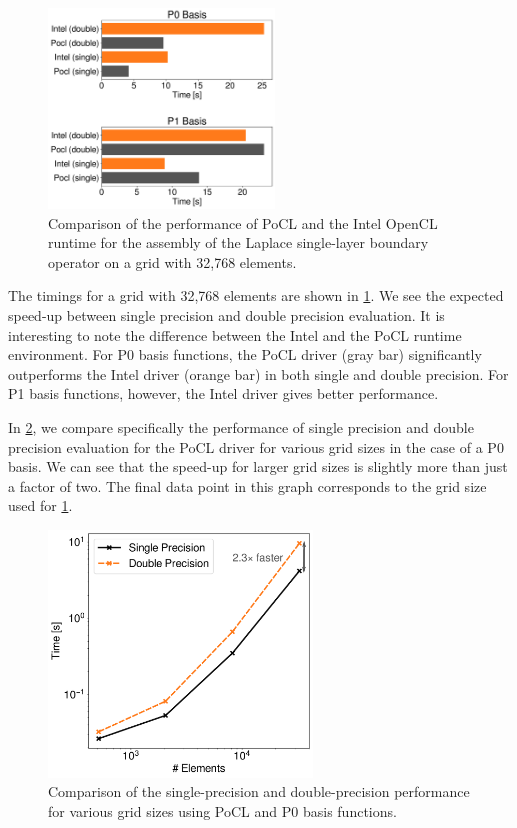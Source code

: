 \documentclass{IEEEcsmag}
\begin{document}
\begin{figure}
	\center
	\includegraphics[width=6cm]{intel_pocl_laplace_comp.pdf}
	\caption{Comparison of the performance of PoCL and the Intel OpenCL runtime for the assembly of the Laplace single-layer boundary operator on a grid with 32,768 elements.}
	\label{fig:intel_pocl_laplace_cmp}
\end{figure}

The timings for a grid with 32,768 elements are shown in \cref{fig:intel_pocl_laplace_cmp}. We see the expected speed-up between single precision and double precision evaluation. It is interesting to note the difference between the Intel and the PoCL runtime environment. For P0 basis functions, the PoCL driver (gray bar) significantly outperforms the Intel driver (orange bar) in both single and double precision. For P1 basis functions, however, the Intel driver gives better performance.

In \cref{fig:pocl_single_layer}, we compare specifically the performance of single precision and double precision evaluation for the PoCL driver for various grid sizes in the case of a P0 basis. We can see that the speed-up for larger grid sizes is slightly more than just a factor of two. The final data point in this graph corresponds to the grid size used for \cref{fig:intel_pocl_laplace_cmp}.

\begin{figure}
	\center
	\includegraphics[width=7cm]{pocl_single_layer.pdf}
	\caption{Comparison of the single-precision and double-precision performance for various grid sizes using PoCL and P0 basis functions.}
	\label{fig:pocl_single_layer}
\end{figure}
\end{document}
